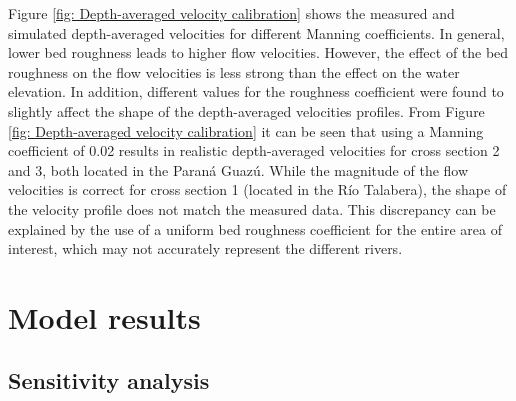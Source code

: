 Figure \ref{fig: Depth-averaged velocity calibration} shows the measured and simulated depth-averaged velocities for different Manning coefficients. In general, lower bed roughness leads to higher flow velocities. However, the effect of the bed roughness on the flow velocities is less strong than the effect on the water elevation. In addition, different values for the roughness coefficient were found to slightly affect the shape of the depth-averaged velocities profiles. From Figure \ref{fig: Depth-averaged velocity calibration} it can be seen that using a Manning coefficient of 0.02 results in realistic depth-averaged velocities for cross section 2 and 3, both located in the Paraná Guazú. While the magnitude of the flow velocities is correct for cross section 1 (located in the Río Talabera), the shape of the velocity profile does not match the measured data. This discrepancy can be explained by the use of a uniform bed roughness coefficient for the entire area of interest, which may not accurately represent the different rivers.

\section{Model results}



\subsection{Sensitivity analysis}



